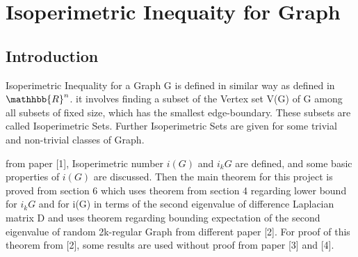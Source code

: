 \documentclass[oneside]{book}
\begin{document}
    
    
    
    
    
    
    
    
    
    
    
    
    
    
    
    
    
    
    
    
    
    
    
    
    
    
    
    
    
    
    
    
    
    
    
    
    \chapter{Isoperimetric Inequaity for Graph}
    \section{Introduction}
  
 
  Isoperimetric Inequality for a Graph G is defined in similar way as defined in $\mathhbb{R}^n$. it involves finding a subset of the Vertex set V(G) of G among all subsets of fixed size, which has the smallest edge-boundary. These subsets are called Isoperimetric Sets. Further  Isoperimetric Sets are given for some trivial and non-trivial classes of Graph. \par 
    from paper [1], Isoperimetric number $i(G)$ and $i_k{G}$ are defined, and some basic properties of $i(G)$  are discussed. Then the main theorem for this project is proved from section 6 which uses theorem from section 4 regarding lower bound for $i_k{G}$ and for i(G) in terms of the second eigenvalue of difference Laplacian matrix D and uses theorem regarding bounding expectation of the second eigenvalue of random 2k-regular Graph from different paper [2]. For proof of this theorem from [2], some results are used without proof from paper [3] and [4].\par
  
\end{document}
